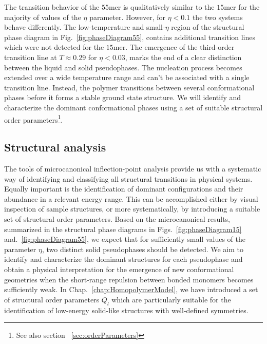 \documentclass[12pt]{report}
\begin{document}
The transition behavior of the $55$mer is qualitatively similar to the $15$mer for the majority of values of the $\eta$ parameter. However, for $\eta < 0.1$ the two systems behave differently. The low-temperature and small-$\eta$ region of the structural phase diagram in Fig.~\ref{fig:phaseDiagram55}, contains additional transition lines which were not detected for the $15$mer. The emergence of the third-order transition line at $T \approx 0.29$ for $\eta < 0.03$, marks the end of a clear distinction between the liquid and solid pseudophases. The nucleation process becomes extended over a wide temperature range and can't be associated with a single transition line. Instead, the polymer transitions between several conformational phases before it forms a stable ground state structure. We will identify and characterize the dominant conformational phases using a set of suitable structural order parameters\footnote{See also section ~\ref{sec:orderParameters}}.
 

\subsection{Structural analysis}
%
The tools of microcanonical inflection-point analysis provide us with a systematic way of identifying and classifying all structural transitions in physical systems. Equally important is the identification of dominant configurations and their abundance in a relevant energy range. This can be accomplished either by visual inspection of sample structures, or more systematically, by introducing a suitable set of structural order parameters. Based on the microcanonical results, summarized in the structural phase diagrams in Figs.~\ref{fig:phaseDiagram15} and.~\ref{fig:phaseDiagram55}, we expect that for sufficiently small values of the parameter $\eta$, two distinct solid pseudophases should be detected. We aim to identify and characterize the dominant structures for each pseudophase and obtain a physical interpretation for the emergence of new conformational geometries when the short-range repulsion between bonded monomers becomes sufficiently weak. In Chap.~\ref{chap:HomopolymerModel}, we have introduced a set of structural order parameters $Q_{l}$ which are particularly suitable for the identification of low-energy solid-like structures with well-defined symmetries.
%
\end{document}
